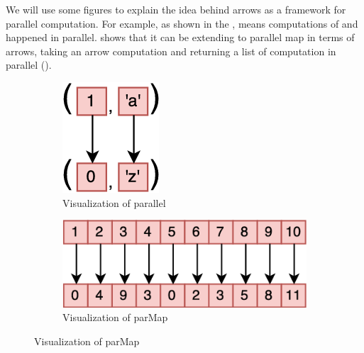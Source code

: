 We will use some figures to explain the idea behind arrows as a framework for parallel computation. For example, as shown in the ,  means computations of  and  happened in parallel.  shows that it can be extending to parallel map in terms of arrows, taking an arrow computation  and returning a list of computation in parallel (). 
\begin{figure}[ht]
\begin{subfigure}[b]{0.475\textwidth}
  \centering
  \includegraphics[width=\textwidth/3]{background/image/pareval2.png}
  \caption{Visualization of parallel \hask{***}\cite{braunArrowsParallelComputation2018}}
  \label{b:ar:p3}
\end{subfigure}
\hfill
\begin{subfigure}[b]{0.475\textwidth}
  \centering
  \includegraphics[width=\textwidth]{background/image/parevaln.png}
  \caption{Visualization of parMap \cite{braunArrowsParallelComputation2018}}
  \label{b:ar:p4}
\end{subfigure}
\end{figure}
